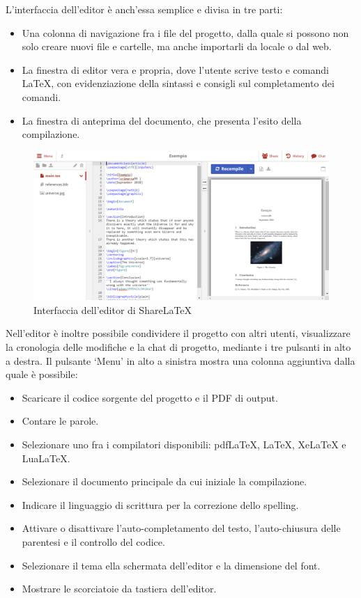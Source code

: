 L'interfaccia dell'editor è anch'essa semplice e divisa in tre parti:
\begin{itemize}
    \item Una colonna di navigazione fra i file del progetto, dalla quale si possono non solo creare nuovi file e cartelle, ma anche importarli da locale o dal web.
    \item La finestra di editor vera e propria, dove l'utente scrive testo e comandi \LaTeX, con evidenziazione della sintassi e consigli sul completamento dei comandi.
    \item La finestra di anteprima del documento, che presenta l'esito della compilazione.
\end{itemize}
\begin{figure}[h]
    \centering
    \includegraphics[width=\textwidth]{immagini/editor.PNG}
    \caption{Interfaccia dell'editor di ShareLaTeX}
    \label{fig:sharelatex_editor}
\end{figure}
Nell'editor è inoltre possibile condividere il progetto con altri utenti, visualizzare la cronologia delle modifiche e la chat di progetto, mediante i tre pulsanti in alto a destra.
Il pulsante \enquote*{Menu} in alto a sinistra mostra una colonna aggiuntiva dalla quale è possibile:
\begin{itemize}
    \item Scaricare il codice sorgente del progetto e il PDF di output.
    \item Contare le parole.
    \item Selezionare uno fra i compilatori disponibili: pdfLaTeX, \LaTeX, XeLaTeX e LuaLaTeX.
    \item Selezionare il documento principale da cui iniziale la compilazione.
    \item Indicare il linguaggio di scrittura per la correzione dello spelling.
    \item Attivare o disattivare l'auto-completamento del testo, l'auto-chiusura delle parentesi e il controllo del codice.
    \item Selezionare il tema ella schermata dell'editor e la dimensione del font.
    \item Mostrare le scorciatoie da tastiera dell'editor.
\end{itemize}

